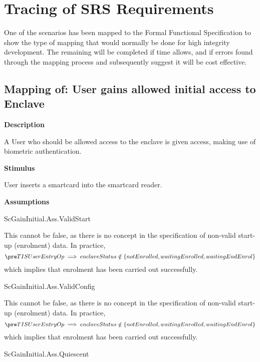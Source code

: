 \chapter{Tracing of SRS Requirements}
\label{sec:SRSTrace}

One of the scenarios has been mapped to the Formal Functional Specification to show the type of mapping that would normally be done for high integrity development. The remaining will be completed if time allows, and if errors found through the mapping process and subsequently suggest it will be cost effective.

\section{Mapping of: User gains allowed initial access to Enclave}

{\footnotesize \sf
{\bf Description}

A User who should be allowed access to the enclave is given access, making use of biometric authentication.

{\bf Stimulus}

User inserts a smartcard into the smartcard reader.

{\bf Assumptions}

ScGainInitial.Ass.ValidStart
}

This cannot be false, as there is no concept in the specification of
non-valid start-up (enrolment) data. In practice, 
\[
\pre TISUserEntryOp
\implies enclaveStatus \notin \{notEnrolled, waitingEnrolled,
waitingEndEnrol\} 
\] 
which implies that enrolment has been carried out successfully.

{\footnotesize \sf
ScGainInitial.Ass.ValidConfig
}

This cannot be false, as there is no concept in the specification of
non-valid start-up (enrolment) data. In practice, 
\[
\pre TISUserEntryOp \implies enclaveStatus \notin \{notEnrolled,
waitingEnrolled, waitingEndEnrol\} 
\]
which implies that enrolment has been carried out successfully.

{\footnotesize \sf
ScGainInitial.Ass.Quiescent
}

